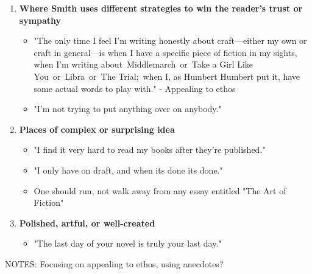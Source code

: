 	\begin{enumerate}
		\item \textbf{Where Smith uses different strategies to win the reader's trust or sympathy}

			\begin{itemize}
				\item "The only time I feel I’m writing honestly about craft—either my own or craft in general—is when I have a specific piece of fiction in my sights, when I’m writing about Middlemarch or Take a Girl Like You or Libra or The Trial; when I, as Humbert Humbert put it, have some actual words to play with." - Appealing to ethos
				\item "I'm not trying to put anything over on anybody."
			\end{itemize}


		\item \textbf{Places of complex or surprising idea}

			\begin{itemize}
				\item "I find it very hard to read my books after they're published."
				\item "I only have on draft, and when its done its done."
				\item One should run, not walk away from any essay entitled "The Art of Fiction"
			\end{itemize}

		\item \textbf{Polished, artful, or well-created}

			\begin{itemize}
				\item "The last day of your novel is truly your last day."
			\end{itemize}
	\end{enumerate}

	NOTES: Focusing on appealing to ethos, using anecdotes?
